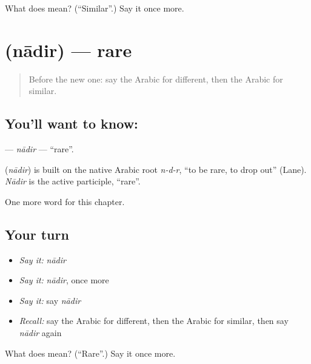 \begin{tcolorbox}[breakable,colback=teal!4,colframe=teal!35!black,title={Before you move on}]
What does  mean? (\textquotedblleft{}Similar\textquotedblright{}.) Say it once more.
\end{tcolorbox}
\section[\texorpdfstring{\ar{نادر} (nādir)}{نادر (nādir)}]{ (nādir) — rare}

\label{lesson:AR-C211-nadir}



\begin{quote}
Before the new one: say the Arabic for different, then the Arabic for similar.
\end{quote}

\subsection*{You'll want to know: }
\textbf{} — \emph{nādir} — \textquotedblleft{}rare\textquotedblright{}.

\begin{cousinweb}
\textbf{} (\emph{nādir}) is built on the native Arabic root \emph{n-d-r}, \textquotedblleft{}to be rare, to drop out\textquotedblright{} (Lane). \emph{Nādir} is the active participle, \textquotedblleft{}rare\textquotedblright{}.
\end{cousinweb}

\begin{grammarlens}[title={What you've built}]
One more word for this chapter.
\end{grammarlens}

\subsection*{Your turn}
\begin{itemize}
\raggedright
  \item \emph{Say it:} \emph{nādir}
  \item \emph{Say it:} \emph{nādir}, once more
  \item \emph{Say it:} say \emph{nādir}
  \item \emph{Recall:} say the Arabic for different, then the Arabic for similar, then say \emph{nādir} again
\end{itemize}

\begin{tcolorbox}[breakable,colback=teal!4,colframe=teal!35!black,title={Before you move on}]
What does  mean? (\textquotedblleft{}Rare\textquotedblright{}.) Say it once more.
\end{tcolorbox}
